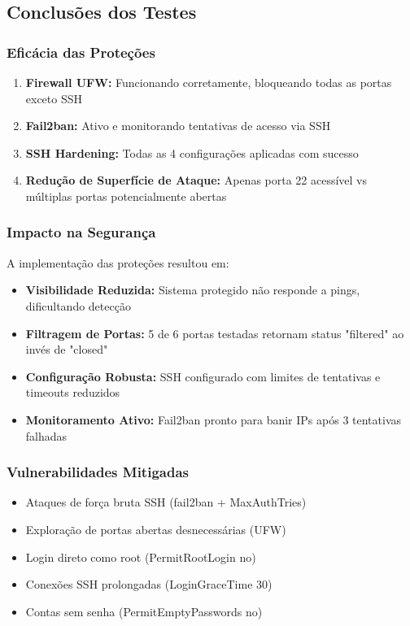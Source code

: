 \documentclass[12pt]{article}
\begin{document}
\subsection{Conclusões dos Testes}

\subsubsection{Eficácia das Proteções}
\begin{enumerate}
    \item \textbf{Firewall UFW:} Funcionando corretamente, bloqueando todas as portas exceto SSH
    \item \textbf{Fail2ban:} Ativo e monitorando tentativas de acesso via SSH
    \item \textbf{SSH Hardening:} Todas as 4 configurações aplicadas com sucesso
    \item \textbf{Redução de Superfície de Ataque:} Apenas porta 22 acessível vs múltiplas portas potencialmente abertas
\end{enumerate}

\subsubsection{Impacto na Segurança}
A implementação das proteções resultou em:
\begin{itemize}
    \item \textbf{Visibilidade Reduzida:} Sistema protegido não responde a pings, dificultando detecção
    \item \textbf{Filtragem de Portas:} 5 de 6 portas testadas retornam status "filtered" ao invés de "closed"
    \item \textbf{Configuração Robusta:} SSH configurado com limites de tentativas e timeouts reduzidos
    \item \textbf{Monitoramento Ativo:} Fail2ban pronto para banir IPs após 3 tentativas falhadas
\end{itemize}

\subsubsection{Vulnerabilidades Mitigadas}
\begin{itemize}
    \item Ataques de força bruta SSH (fail2ban + MaxAuthTries)
    \item Exploração de portas abertas desnecessárias (UFW)
    \item Login direto como root (PermitRootLogin no)
    \item Conexões SSH prolongadas (LoginGraceTime 30)
    \item Contas sem senha (PermitEmptyPasswords no)
\end{itemize}
\end{document}
